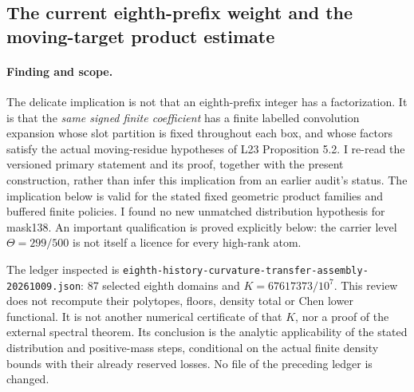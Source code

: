 \subsection{The current eighth-prefix weight and the moving-target product estimate}
\label{sec:current-eighth-distribution-interface-audit-20261009}

\paragraph{Finding and scope.}
The delicate implication is not that an eighth-prefix integer has a
factorization. It is that the \emph{same signed finite coefficient}
has a finite labelled convolution expansion whose slot partition is
fixed throughout each box, and whose factors satisfy the actual
moving-residue hypotheses of L23 Proposition 5.2. I re-read the
versioned primary statement and its proof, together with the present
construction, rather than infer this implication from an earlier
audit's status. The implication below is valid for the stated fixed
geometric product families and buffered finite policies. I found no
new unmatched distribution hypothesis for mask138. An important
qualification is proved explicitly below: the carrier level
$\Theta=299/500$ is not itself a licence for every high-rank atom.

The ledger inspected is
\texttt{eighth-history-curvature-transfer-assembly-20261009.json}:
87 selected eighth domains and $K=67617373/10^7$. This review does
not recompute their polytopes, floors, density total or Chen lower
functional. It is not another numerical certificate of that $K$,
nor a proof of the external spectral theorem. Its conclusion is the
analytic applicability of the stated distribution and positive-mass
steps, conditional on the actual finite density bounds with their
already reserved losses. No file of the preceding ledger is changed.

